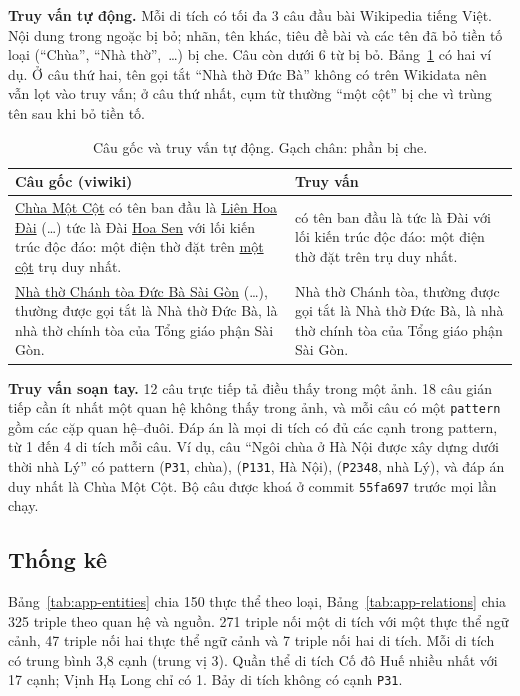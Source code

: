 \textbf{Truy vấn tự động.} Mỗi di tích có tối đa 3 câu đầu bài Wikipedia tiếng Việt. Nội dung trong ngoặc bị bỏ;
nhãn, tên khác, tiêu đề bài và các tên đã bỏ tiền tố loại (``Chùa'', ``Nhà thờ'',~\ldots) bị che. Câu còn dưới 6
từ bị bỏ. Bảng~\ref{tab:app-mask} có hai ví dụ. Ở câu thứ hai, tên gọi tắt ``Nhà thờ Đức Bà'' không có trên
Wikidata nên vẫn lọt vào truy vấn; ở câu thứ nhất, cụm từ thường ``một cột'' bị che vì trùng tên sau khi bỏ tiền tố.

\begin{table}[!htb]
\centering
\caption{Câu gốc và truy vấn tự động. Gạch chân: phần bị che.}
\label{tab:app-mask}
\scriptsize
\setlength{\tabcolsep}{3pt}
\begin{tabular}{@{}>{\raggedright\arraybackslash}p{4.2cm}>{\raggedright\arraybackslash}p{4.1cm}@{}}
\toprule
Câu gốc (viwiki) & Truy vấn \\
\midrule
\underline{Chùa Một Cột} có tên ban đầu là \underline{Liên Hoa Đài} (\ldots) tức là Đài \underline{Hoa Sen} với
lối kiến trúc độc đáo: một điện thờ đặt trên \underline{một cột} trụ duy nhất. & có tên ban đầu là tức là Đài với
lối kiến trúc độc đáo: một điện thờ đặt trên trụ duy nhất. \\
\underline{Nhà thờ Chánh tòa Đức Bà Sài Gòn} (\ldots), thường được gọi tắt là Nhà thờ Đức Bà, là nhà thờ chính
tòa của Tổng giáo phận Sài Gòn. & Nhà thờ Chánh tòa, thường được gọi tắt là Nhà thờ Đức Bà, là nhà thờ chính tòa
của Tổng giáo phận Sài Gòn. \\
\bottomrule
\end{tabular}
\end{table}

\textbf{Truy vấn soạn tay.} 12 câu trực tiếp tả điều thấy trong một ảnh. 18 câu gián tiếp cần ít nhất một quan hệ
không thấy trong ảnh, và mỗi câu có một \texttt{pattern} gồm các cặp quan hệ--đuôi. Đáp án là mọi di tích có đủ các
cạnh trong pattern, từ 1 đến 4 di tích mỗi câu. Ví dụ, câu ``Ngôi chùa ở Hà Nội được xây dựng dưới thời nhà Lý'' có
pattern (\texttt{P31}, chùa), (\texttt{P131}, Hà Nội), (\texttt{P2348}, nhà Lý), và đáp án duy nhất là Chùa Một
Cột. Bộ câu được khoá ở commit \texttt{55fa697} trước mọi lần chạy.

\subsection{Thống kê}\label{app:vn-stats}

Bảng~\ref{tab:app-entities} chia 150 thực thể theo loại, Bảng~\ref{tab:app-relations} chia 325 triple theo quan hệ
và nguồn. 271 triple nối một di tích với một thực thể ngữ cảnh, 47 triple nối hai thực thể ngữ cảnh và 7 triple nối
hai di tích. Mỗi di tích có trung bình 3,8 cạnh (trung vị 3). Quần thể di tích Cố đô Huế nhiều nhất với 17 cạnh;
Vịnh Hạ Long chỉ có 1. Bảy di tích không có cạnh \texttt{P31}.

